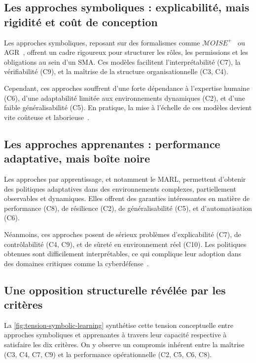 \subsection{Les approches symboliques : explicabilité, mais rigidité et coût de conception}

Les approches symboliques, reposant sur des formalismes comme $\mathcal{M}OISE^+$~\cite{hubner2002moise} ou \ac{AGR}~\cite{Ferber2004}, offrent un cadre rigoureux pour structurer les rôles, les permissions et les obligations au sein d'un \ac{SMA}. Ces modèles facilitent l'interprétabilité (C7), la vérifiabilité (C9), et la maîtrise de la structure organisationnelle (C3, C4).

Cependant, ces approches souffrent d'une forte dépendance à l'expertise humaine (C6), d'une adaptabilité limitée aux environnements dynamiques (C2), et d'une faible généralisabilité (C5). En pratique, la mise à l'échelle de ces modèles devient vite coûteuse et laborieuse~\cite{Picard2006}.

\subsection{Les approches apprenantes : performance adaptative, mais boîte noire}

Les approches par apprentissage, et notamment le \ac{MARL}, permettent d'obtenir des politiques adaptatives dans des environnements complexes, partiellement observables et dynamiques. Elles offrent des garanties intéressantes en matière de performance (C8), de résilience (C2), de généralisabilité (C5), et d'automatisation (C6).

Néanmoins, ces approches posent de sérieux problèmes d'explicabilité (C7), de contrôlabilité (C4, C9), et de sûreté en environnement réel (C10). Les politiques obtenues sont difficilement interprétables, ce qui complique leur adoption dans des domaines critiques comme la cyberdéfense~\cite{Gunning2019}.

\subsection{Une opposition structurelle révélée par les critères}

La \autoref{fig:tension-symbolic-learning} synthétise cette tension conceptuelle entre approches symboliques et apprenantes à travers leur capacité respective à satisfaire les dix critères. On y observe un compromis inhérent entre la maîtrise (C3, C4, C7, C9) et la performance opérationnelle (C2, C5, C6, C8).

